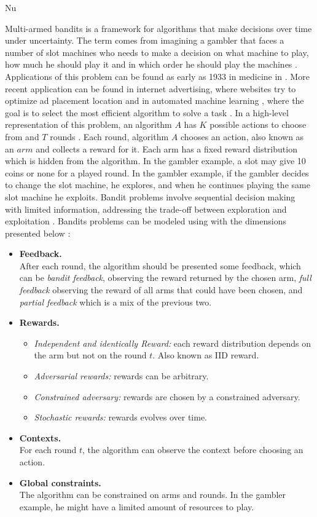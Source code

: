 Nu\documentclass[11pt,twoside, a4paper]{report}
\begin{document}
Multi-armed bandits is a framework for algorithms that make decisions over time under uncertainty. The term  comes from imagining a gambler that faces a number of slot machines who needs to make a decision on what machine to play, how much he should play it and in which order he should play the machines \parencite{Slivkins2019}. Applications of this problem can be found as early as 1933 in medicine in . More recent application can be found in internet advertising, where websites try to optimize ad placement location \parencite{pandey2007a} and in automated machine learning , where the goal is to select the most efficient algorithm to solve a task \parencite{DasDores2018}. In a high-level representation of this problem, an algorithm $A$ has $K$ possible actions to choose from and $T$ rounds \parencite{Shang2019a}. Each round, algorithm $A$ chooses an action, also known as an $arm$ and collects a reward for it. Each arm has a fixed reward distribution which is hidden from the algorithm. In the gambler example, a slot may give 10 coins or none for a played round. In the gambler example, if the gambler decides to change the slot machine, he explores, and when he continues playing the same slot machine he exploits. Bandit problems involve sequential decision making with limited information, addressing the trade-off between exploration and exploitation \parencite{Bubeck2012}. Bandits problems can be modeled using with the dimensions presented below \parencite{Slivkins2019}:
\begin{itemize}
    \item \textbf{Feedback.} \\
    After each round, the algorithm should be presented some feedback, which can be \emph{bandit feedback}, observing the reward returned by the chosen arm, \emph{full feedback} observing the reward of all arms that could have been chosen, and \emph{partial feedback} which is a mix of the previous two.
    \item \textbf{Rewards.}
    \begin{itemize}
        \item \emph{Independent and identically Reward:} each reward distribution depends on the arm but not on the round $t$. Also known as IID reward. 
        \item \emph{Adversarial rewards:} rewards can be arbitrary.
        \item \emph{Constrained adversary:} rewards are chosen by a constrained adversary.
        \item \emph{Stochastic rewards:} rewards evolves over time.
    \end{itemize}
    \item \textbf{Contexts.} \\
    For each round $t$, the algorithm can observe the context before choosing an action. 
    \item \textbf{Global constraints.} \\
    The algorithm can be constrained on arms and rounds. In the gambler example, he might have a limited amount of resources to play.
\end{itemize}
\end{document}
